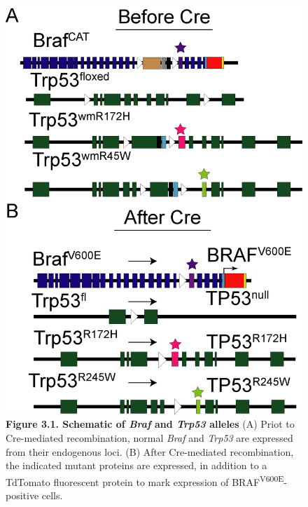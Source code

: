 \begin{figure}
\hypertarget{fig:3.1}{%
\centering
\includegraphics[width=1\textwidth,height=\textheight]{images/p53_1.png}
\caption{\textbf{Figure 3.1. Schematic of \emph{Braf} and \emph{Trp53} alleles} (A) Priot to Cre-mediated recombination, normal \emph{Braf} and \emph{Trp53} are expressed from their endogenous loci. (B) After Cre-mediated recombination, the indicated mutant proteins are expressed, in addition to a TdTomato fluorescent protein to mark expression of BRAF\textsuperscript{V600E}-positive cells.}\label{fig:3.1}
}
\end{figure}

